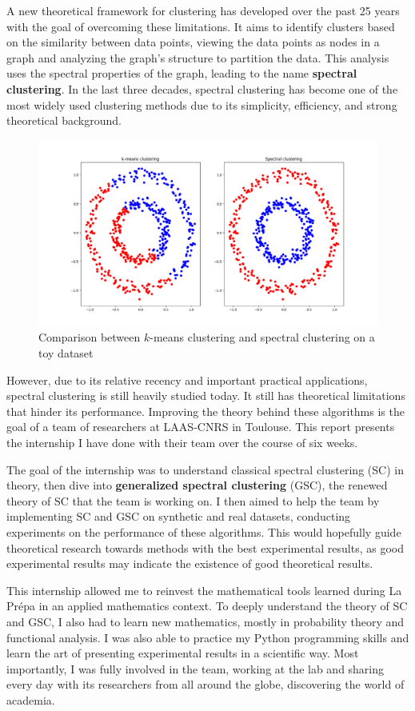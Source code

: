 \documentclass[a4paper,12pt]{article}
\theoremstyle{definition}
\theoremstyle{plain}
\begin{document}
A new theoretical framework for clustering has developed over the past 25 years with the goal of overcoming these limitations. It aims to identify clusters based on the similarity between data points, viewing the data points as nodes in a graph and analyzing the graph's structure to partition the data. This analysis uses the spectral properties of the graph, leading to the name \textbf{spectral clustering}. In the last three decades, spectral clustering has become one of the most widely used clustering methods due to its simplicity, efficiency, and strong theoretical background.
\begin{figure}[H]
	\centering
	\includegraphics[width=0.7\linewidth]{figures/Fig1}
	\caption{Comparison between $k$-means clustering and spectral clustering on a toy dataset}
	\label{fig:fig1}
\end{figure}

However, due to its relative recency and important practical applications, spectral clustering is still heavily studied today. It still has theoretical limitations that hinder its performance. Improving the theory behind these algorithms is the goal of a team of researchers at LAAS-CNRS in Toulouse. This report presents the internship I have done with their team over the course of six weeks.

The goal of the internship was to understand classical spectral clustering (SC) in theory, then dive into \textbf{generalized spectral clustering} (GSC), the renewed theory of SC that the team is working on. I then aimed to help the team by implementing SC and GSC on synthetic and real datasets, conducting experiments on the performance of these algorithms. This would hopefully guide theoretical research towards methods with the best experimental results, as good experimental results may indicate the existence of good theoretical results.

This internship allowed me to reinvest the mathematical tools learned during La Prépa in an applied mathematics context. To deeply understand the theory of SC and GSC, I also had to learn new mathematics, mostly in probability theory and functional analysis. I was also able to practice my Python programming skills and learn the art of presenting experimental results in a scientific way. Most importantly, I was fully involved in the team, working at the lab and sharing every day with its researchers from all around the globe, discovering the world of academia.
\end{document}
